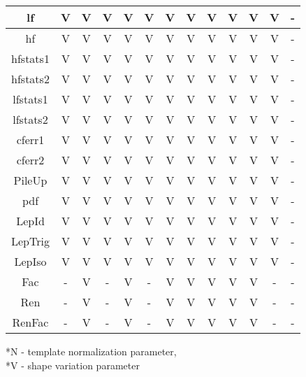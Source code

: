 \documentclass{article}
\begin{document}
\begin{center}
\begin{small}
\begin{tabular}{ | c |  c | c | c | c | c | c | c | c | c | c | c | c |  }
      \hline
      lf  & V  & V  & V  & V  & V  & V  & V  & V  & V  & V  & V  & -  \\
      \hline
      hf  & V  & V  & V  & V  & V  & V  & V  & V  & V  & V  & V  & -  \\
      \hline
      hfstats1  & V  & V  & V  & V  & V  & V  & V  & V  & V  & V  & V  & -  \\
      \hline
      hfstats2  & V  & V  & V  & V  & V  & V  & V  & V  & V  & V  & V  & -  \\
      \hline
      lfstats1  & V  & V  & V  & V  & V  & V  & V  & V  & V  & V  & V  & -  \\
      \hline
      lfstats2  & V  & V  & V  & V  & V  & V  & V  & V  & V  & V  & V  & -  \\
      \hline
      cferr1  & V  & V  & V  & V  & V  & V  & V  & V  & V  & V  & V  & -  \\
      \hline
      cferr2  & V  & V  & V  & V  & V  & V  & V  & V  & V  & V  & V  & -  \\
      \hline
      PileUp  & V  & V  & V  & V  & V  & V  & V  & V  & V  & V  & V  & -  \\
      \hline
      pdf  & V  & V  & V  & V  & V  & V  & V  & V  & V  & V  & V  & -  \\
      \hline
      LepId  & V  & V  & V  & V  & V  & V  & V  & V  & V  & V  & V  & -  \\
      \hline
      LepTrig  & V  & V  & V  & V  & V  & V  & V  & V  & V  & V  & V  & -  \\
      \hline
      LepIso  & V  & V  & V  & V  & V  & V  & V  & V  & V  & V  & V  & -  \\
      \hline
      Fac  & -  & V  & -  & V  & -  & V  & V  & V  & V  & V  & -  & -  \\
      \hline
      Ren  & -  & V  & -  & V  & -  & V  & V  & V  & V  & V  & -  & -  \\
      \hline
      RenFac  & -  & V  & -  & V  & -  & V  & V  & V  & V  & V  & -  & -  \\
      \hline

    \hline
    \end{tabular}


  *N - template normalization parameter,\\
  *V - shape variation parameter\
  \end{small}
  

\end{center}
\end{document}
